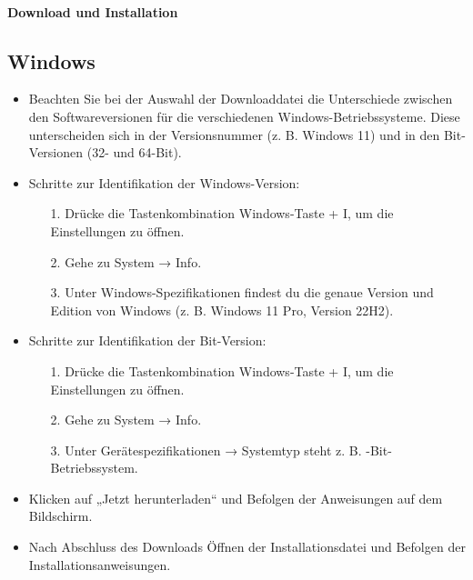 \paragraph{ Download und Installation}
\subsection*{Windows}
\begin{itemize}
	\item Beachten Sie bei der Auswahl der Downloaddatei die Unterschiede zwischen den Softwareversionen für die verschiedenen Windows-Betriebssysteme. Diese unterscheiden sich in der Versionsnummer (z. B. \glqq Windows 11\grqq {}) und in den Bit-Versionen (32- und 64-Bit).
	\item Schritte zur Identifikation der Windows-Version:
		\begin{itemize}
		\item[1.] Drücke die Tastenkombination Windows-Taste + I, um die Einstellungen zu öffnen.
		\item[2.] Gehe zu System → Info.
		\item[3.] Unter Windows-Spezifikationen findest du die genaue Version und Edition von Windows (z. B. \glqq Windows 11 Pro\grqq {}, \glqq Version 22H2\grqq {}).
		\end{itemize}
	\item Schritte zur Identifikation der Bit-Version:
		\begin{itemize}
		\item[1.] Drücke die Tastenkombination Windows-Taste + I, um die Einstellungen zu öffnen.
		\item[2.] Gehe zu System → Info.
		\item[3.] 	Unter Gerätespezifikationen → Systemtyp steht z. B. -Bit-Betriebssystem\grqq {}.
		\end{itemize}
	\item Klicken auf „Jetzt herunterladen“ und Befolgen der Anweisungen auf dem Bildschirm.
	\item Nach Abschluss des Downloads Öffnen der Installationsdatei und Befolgen der Installationsanweisungen.
\end{itemize}
